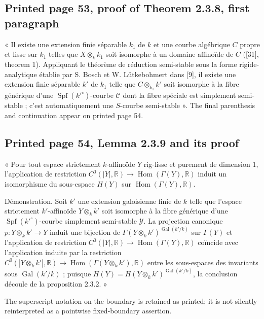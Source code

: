 \documentclass[
  10pt,
]{article}
\begin{document}
\subsection{Printed page 53, proof of Theorem 2.3.8, first
paragraph}\label{printed-page-53-proof-of-theorem-2.3.8-first-paragraph}

« Il existe une extension finie séparable \(k_1\) de \(k\) et une courbe
algébrique \(C\) propre et lisse sur \(k_1\) telles que
\(X\otimes_k k_1\) soit isomorphe à un domaine affinoïde de \(C\)
({[}31{]}, theorem 1). Appliquant le théorème de réduction semi-stable
sous la forme rigide-analytique établie par S. Bosch et W. Lütkebohmert
dans {[}9{]}, il existe une extension finie séparable \(k'\) de \(k_1\)
telle que \(C\otimes_{k_1} k'\) soit isomorphe à la fibre générique
d'une \(\operatorname{Spf}(k'^\circ)\)-courbe \(\mathcal C\) dont la
fibre spéciale est simplement semi-stable ; c'est automatiquement une
\(S\)-courbe semi-stable ». The final parenthesis and continuation
appear on printed page 54.

\subsection{Printed page 54, Lemma 2.3.9 and its
proof}\label{printed-page-54-lemma-2.3.9-and-its-proof}

« Pour tout espace strictement \(k\)-affinoïde \(Y\) rig-lisse et
purement de dimension \(1\), l'application de restriction
\(C^0(|Y|,\mathbb R)\to\operatorname{Hom}(\Gamma(Y),\mathbb R)\) induit
un isomorphisme du sous-espace \(H(Y)\) sur
\(\operatorname{Hom}(\Gamma(Y),\mathbb R)\).

Démonstration. Soit \(k'\) une extension galoisienne finie de \(k\)
telle que l'espace strictement \(k'\)-affinoïde \(Y\otimes_k k'\) soit
isomorphe à la fibre générique d'une
\(\operatorname{Spf}(k'^\circ)\)-courbe simplement semi-stable
\(\mathcal Y\). La projection canonique \(p:Y\otimes_k k'\to Y\) induit
une bijection de \(\Gamma(Y\otimes_k k')^{\operatorname{Gal}(k'/k)}\)
sur \(\Gamma(Y)\) et l'application de restriction
\(C^0(|Y|,\mathbb R)\to\operatorname{Hom}(\Gamma(Y),\mathbb R)\)
coïncide avec l'application induite par la restriction
\(C^0(|Y\otimes_k k'|,\mathbb R)\to
\operatorname{Hom}(\Gamma(Y\otimes_k k'),\mathbb R)\) entre les
sous-espaces des invariants sous \(\operatorname{Gal}(k'/k)\) ; puisque
\(H(Y)=H(Y\otimes_k k')^{\operatorname{Gal}(k'/k)}\), la conclusion
découle de la proposition 2.3.2. »

The superscript notation on the boundary is retained as printed; it is
not silently reinterpreted as a pointwise fixed-boundary assertion.
\end{document}
